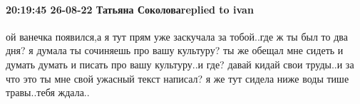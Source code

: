  
 
 
 
 

\paragraph{20:19:45 26-08-22 Татьяна Соколоваreplied to ivan}

ой ванечка появился,а я тут прям уже заскучала за тобой..где ж ты был то два
дня? я думала ты сочиняешь про вашу культуру? ты же обещал мне сидеть и думать
думать и писать про вашу культуру..и где? давай кидай свои труды..и за что это
ты мне свой ужасный текст написал? я же тут сидела ниже воды тише травы..тебя
ждала..
